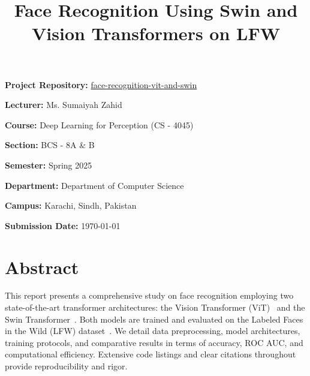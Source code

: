 \documentclass[twocolumn]{IEEEtran}
\begin{document}
\begin{titlepage}
\begin{flushleft}
        \textbf{Project Repository:} \href{https://github.com/muhammadhamzagova666/face-recognition-vit-and-swin}{face-recognition-vit-and-swin}\\
        \vspace{10pt}
        
        \textbf{Lecturer:} Ms. Sumaiyah Zahid\\
        \vspace{10pt}
        
        \textbf{Course:} Deep Learning for Perception (CS - 4045)\\
        \vspace{10pt}

        \textbf{Section:} BCS - 8A \& B\\
        \vspace{10pt}

        \textbf{Semester:} Spring 2025\\
        \vspace{10pt}

        \textbf{Department:} Department of Computer Science\\
        \vspace{10pt}

        \textbf{Campus:} Karachi, Sindh, Pakistan\\
        \vspace{10pt}
        
        \textbf{Submission Date:} \today\\  
    \end{flushleft}
\end{titlepage}

\title{Face Recognition Using Swin and Vision Transformers on LFW}
\maketitle

\section*{Abstract}
\noindent
This report presents a comprehensive study on face recognition employing two state-of-the-art transformer architectures: the Vision Transformer (ViT)~\cite{dosovitskiy2020image} and the Swin Transformer~\cite{liu2021swin}. Both models are trained and evaluated on the Labeled Faces in the Wild (LFW) dataset~\cite{huang2008lfw}. We detail data preprocessing, model architectures, training protocols, and comparative results in terms of accuracy, ROC AUC, and computational efficiency. Extensive code listings and clear citations throughout provide reproducibility and rigor.
\end{document}
